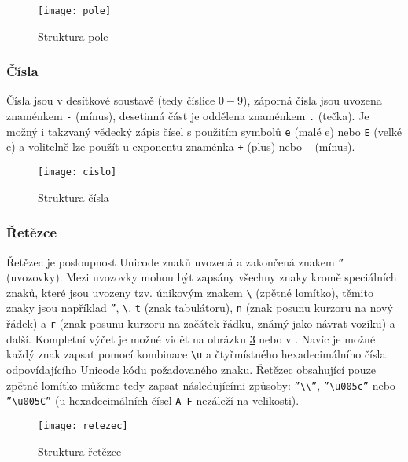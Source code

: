 \begin{figure}[!htb]
\centering
\texttt{[image: pole]}
\caption{Struktura pole}
\label{pole}
\end{figure}

\subsubsection{Čísla}
Čísla jsou v desítkové soustavě (tedy číslice $0 - 9$), záporná čísla jsou uvozena znaménkem \texttt{-} (mínus), desetinná část je oddělena znaménkem \texttt{.} (tečka). Je možný i takzvaný vědecký zápis čísel s použitím symbolů \texttt{e} (malé e) nebo \texttt{E} (velké e) a volitelně lze použít u exponentu znaménka \texttt{+} (plus) nebo \texttt{-} (mínus).

\begin{figure}[!htb]
\centering
\texttt{[image: cislo]}
\caption{Struktura čísla}
\label{cislo}
\end{figure}

\subsubsection{Řetězce}
Řetězec je posloupnost Unicode znaků uvozená a zakončená znakem \texttt{\textquotedblright} (uvozovky). Mezi uvozovky mohou být zapsány všechny znaky kromě speciálních znaků, které jsou uvozeny tzv. únikovým znakem \texttt{\textbackslash} (zpětné lomítko), těmito znaky jsou například \texttt{\textquotedblright}, \texttt{\textbackslash}, \texttt{t} (znak tabulátoru), \texttt{n} (znak posunu kurzoru na nový řádek) a \texttt{r} (znak posunu kurzoru na začátek řádku, známý jako návrat vozíku) a další. Kompletní výčet je možné vidět na obrázku \ref{retezec} nebo v \cite{json}. Navíc je možné každý znak zapsat pomocí kombinace \texttt{\textbackslash u} a čtyřmístného hexadecimálního čísla odpovídajícího Unicode kódu požadovaného znaku. Řetězec obsahující pouze zpětné lomítko můžeme tedy zapsat následujícími způsoby: \texttt{\textquotedblright\textbackslash\textbackslash\textquotedblright}, \texttt{\textquotedblright\textbackslash u005c\textquotedblright} nebo \texttt{\textquotedblright\textbackslash u005C\textquotedblright} (u hexadecimálních čísel \texttt{A-F} nezáleží na velikosti).

\begin{figure}[!htb]
\centering
\texttt{[image: retezec]}
\caption{Struktura řetězce}
\label{retezec}
\end{figure}

